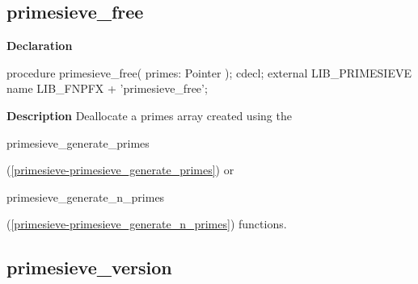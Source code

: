 \documentclass{report}
\newif\ifpdf
\begin{document}
\subsection*{primesieve{\_}free}
\fi
\label{primesieve-primesieve_free}
\begin{list}{}{
\setlength{\itemindent}{0cm}
\setlength{\listparindent}{0cm}
\setlength{\leftmargin}{\evensidemargin}
\addtolength{\leftmargin}{\tmplength}
\settowidth{\labelsep}{X}
\addtolength{\leftmargin}{\labelsep}
\setlength{\labelwidth}{\tmplength}
}
\item[\textbf{Declaration}\hfill]
\ifpdf
\begin{flushleft}
\fi
\begin{ttfamily}
procedure primesieve{\_}free( primes: Pointer ); cdecl; external LIB{\_}PRIMESIEVE name LIB{\_}FNPFX + 'primesieve{\_}free';\end{ttfamily}

\ifpdf
\end{flushleft}
\fi

\par
\item[\textbf{Description}]
Deallocate a primes array created using the \begin{ttfamily}primesieve{\_}generate{\_}primes\end{ttfamily}(\ref{primesieve-primesieve_generate_primes}) or \begin{ttfamily}primesieve{\_}generate{\_}n{\_}primes\end{ttfamily}(\ref{primesieve-primesieve_generate_n_primes}) functions.

\end{list}
\ifpdf
\subsection*{\large{\textbf{primesieve{\_}version}}\normalsize\hspace{1ex}\hrulefill}
\else
\end{document}
